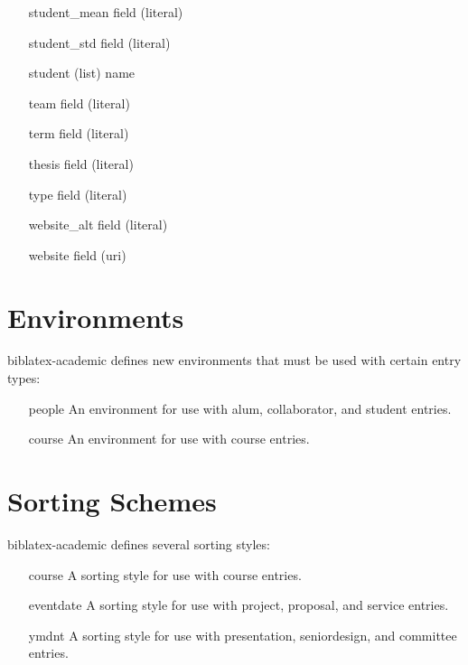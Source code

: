 \documentclass[11pt,letterpaper]{article}
\newcommand{\pkg}[1]{\textsf{#1}}
\newcommand{\entry}[1]{\textsf{#1}}
\newcommand{\field}[1]{\textsf{#1}}
\newcommand{\env}[1]{\textsf{#1}}
\newcommand{\sort}[1]{\textsf{#1}}
\begin{document}
\begin{itemize}
    \item[\field{student\_mean}] field (literal)
    \item[\field{student\_std}] field (literal)
    \item[\field{student}] (list) name
    \item[\field{team}] field (literal)
    \item[\field{term}] field (literal)
    \item[\field{thesis}] field (literal)
    \item[\field{type}] field (literal)
    \item[\field{website\_alt}] field (literal)
    \item[\field{website}] field (uri)
\end{itemize}


\section{Environments}\label{sec:environments}

\pkg{biblatex-academic} defines new environments that must be used with certain entry types:

\begin{itemize}
  \item[\env{people}] An environment for use with \entry{alum}, \entry{collaborator}, and \entry{student} entries.
  \item[\env{course}] An environment for use with \entry{course} entries.
\end{itemize}


\section{Sorting Schemes}\label{sec:sorting}

\pkg{biblatex-academic} defines several sorting styles:

\begin{itemize}
  \item[\sort{course}] A sorting style for use with \entry{course} entries.
  \item[\sort{eventdate}] A sorting style for use with \entry{project}, \entry{proposal}, and \entry{service} entries.
  \item[\sort{ymdnt}] A sorting style for use with \entry{presentation}, \entry{seniordesign}, and \entry{committee} entries.
\end{itemize}
\end{document}
